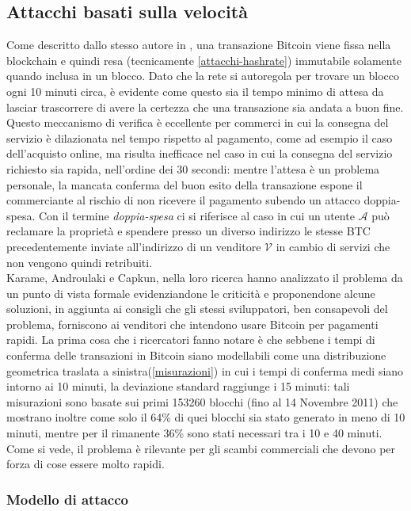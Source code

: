 \subsection{Attacchi basati sulla velocità}\label{double-spending}

Come descritto dallo stesso autore in \cite{bitcoin}, una transazione Bitcoin viene fissa nella blockchain e quindi resa (tecnicamente \ref{attacchi-hashrate}) immutabile solamente quando inclusa in un blocco. Dato che la rete si autoregola per trovare un blocco ogni 10 minuti circa, è evidente come questo sia il tempo minimo di attesa da lasciar trascorrere di avere la certezza che una transazione sia andata a buon fine. Questo meccanismo di verifica è eccellente per commerci in cui la consegna del servizio è dilazionata nel tempo rispetto al pagamento, come ad esempio il caso dell'acquisto online, ma risulta inefficace nel caso in cui la consegna del servizio richiesto sia rapida, nell'ordine dei 30 secondi: mentre l'attesa è un problema personale, la mancata conferma del buon esito della transazione espone il commerciante al rischio di non ricevere il pagamento subendo un attacco doppia-spesa. Con il termine \emph{doppia-spesa} ci si riferisce al caso in cui un utente $\mathcal{A}$ può reclamare la proprietà e spendere presso un diverso indirizzo le stesse BTC precedentemente inviate all'indirizzo di un venditore $\mathcal{V}$ in cambio di servizi che non vengono quindi retribuiti.\\
Karame, Androulaki e Capkun, nella loro ricerca \cite{doublespendig_fast} hanno analizzato il problema da un punto di vista formale evidenziandone le criticità e proponendone alcune soluzioni, in aggiunta ai consigli che gli stessi sviluppatori, ben consapevoli del problema, forniscono ai venditori che intendono usare Bitcoin per pagamenti rapidi.
La prima cosa che i ricercatori fanno notare è che sebbene i tempi di conferma delle transazioni in Bitcoin siano modellabili come una distribuzione geometrica traslata a sinistra(\ref{misurazioni}) in cui i tempi di conferma medi siano intorno ai 10 minuti, la deviazione standard raggiunge i 15 minuti: tali misurazioni sono basate sui primi 153260 blocchi (fino al 14 Novembre 2011) che mostrano inoltre come solo il 64\% di quei blocchi sia stato generato in meno di 10 minuti, mentre per il rimanente 36\% sono stati necessari tra i 10 e 40 minuti. Come si vede, il problema è rilevante per gli scambi commerciali che devono per forza di cose essere molto rapidi.

\subsubsection{Modello di attacco}

